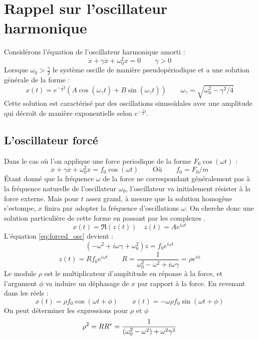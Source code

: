 \chapter{Rappel sur l'oscillateur harmonique}
%
Considérons l'équation de l'oscillateur harmonique amorti :
\begin{dmath}
    \ddot{x} + \gamma\dot{x} + \omega_0^2 x = 0
    \qquad {\gamma > 0}
\end{dmath}   
%
Lorsque $\omega_0 > \frac{\gamma}{2}$ le système oscille de manière pseudopériodique et a une solution générale de la forme :
%
\begin{dmath}
    x(t) = e^{-\frac{\gamma}{2}t}(A\cos(\omega_{\gamma} t) + B\sin(\omega_{\gamma} t))
    \qquad {\omega_{\gamma} = \sqrt{\omega_0^2 - \gamma^2/4}}
\end{dmath}
%
Cette solution est caractérisé par des oscillations sinusoïdales avec une amplitude qui décroît de manière exponentielle selon $e^{-\frac{\gamma}{2} t}$.
%
\section{L'oscillateur forcé}
%
Dans le cas où l’on applique une force periodique de la forme $F_0\cos(\omega t)$ :
%
\begin{equation}
    \ddot{x} + \gamma\dot{x} + \omega_0^2 x = f_0\cos(\omega t)
    \qquad
    \text{Où}
    \qquad
    f_0 = F_0/m
    \label{eq:forced_osc}
\end{equation}
%
Étant donné que la fréquence $\omega$ de la force ne correspondant 
généralement pas à la fréquence naturelle de l'oscillateur $\omega_0$, 
l'oscillateur va initialement résister à la force externe.
Mais pour $t$ assez grand, à mesure que la solution homogène s'estompe, $x$ finira par adopter la 
fréquence d'oscillations $\omega$. 
On cherche donc une solution particulière de cette forme en passant 
par les complexes \cite{feynman_feynman_nodate}.
%
\begin{equation}
    x(t) = \Re(z(t)) \quad z(t) = Ae^{i\omega t}
\end{equation}
%
L'équation \eqref{eq:forced_osc} devient :
%
\begin{equation}
    (-\omega^2 + i\omega\gamma + \omega_0^2)z = f_0 e^{i\omega t}
\end{equation}
%
\begin{equation}
    z(t) = R f_0 e^{i \omega t} \qquad R = \frac{1}{\omega_0^2 - \omega^2 + i\omega\gamma} = \rho e^{i\phi}
\end{equation}
%
Le module $\rho$ est le multiplicateur d’ampltitude en réponse à la force, et l’argument $\phi$ va induire un déphasage de $x$ par rapport à la force.
%
En revenant dans les réels :
\begin{equation}
    x(t) = \rho f_0 \cos(\omega t + \phi)
    \qquad \dot{x}(t) = -\omega \rho f_0 \sin(\omega t + \phi)
\end{equation}
%
On peut déterminer les expressions pour $\rho$ et $\phi$
%
\begin{dmath}
    \rho^2 = RR^* \\
    = \frac{1}{(\omega_0^2 - \omega^2) + \omega^2\gamma^2}
\end{dmath}

